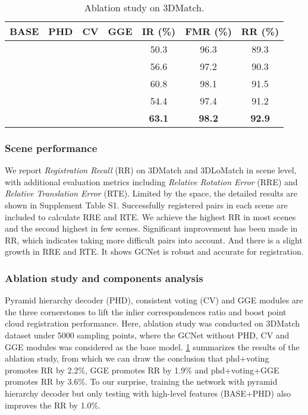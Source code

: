 \documentclass[10pt,twocolumn,letterpaper]{article}
\begin{document}
\begin{table}[t!]
\setlength{\tabcolsep}{4pt}
\centering\footnotesize
\vspace{.25em}
\begin{tabular}{cccc|ccc}
\toprule
BASE & PHD & CV & GGE & IR (\%)  & FMR (\%)  & RR (\%)  \\
\midrule
 & & & & 50.3 & 96.3 & 89.3 \\
 &  & & & 56.6 & 97.2 & 90.3 \\
 &  &  & & 60.8 & 98.1 & 91.5 \\
 & & &  & 54.4 & 97.4 & 91.2 \\
 &  &  &  & {\bf 63.1} & {\bf 98.2} & {\bf 92.9} \\
\bottomrule
\end{tabular}
\vspace{-.75em}
\caption{Ablation study on 3DMatch.}
\vspace{-2em}
\label{tab:ab_study}
\end{table}

\vspace{-1.25em}
\subsubsection{Scene performance} \vspace{-.5em}
We report {\em Registration Recall} (RR) on 3DMatch and 3DLoMatch in scene level, with additional evaluation metrics including  {\em Relative Rotation Error} (RRE) and {\em Relative Translation Error} (RTE). Limited by the space, the detailed results are shown in Supplement Table S1. Successfully registered pairs in each scene are included to calculate RRE and RTE. We achieve the highest RR in most scenes and the second highest in few scenes. Significant improvement has been made in RR, which indicates taking more difficult pairs into account. And there is a slight growth in RRE and RTE. It shows GCNet is robust and accurate for registration.

\vspace{-1.25em}
\subsubsection{Ablation study and components analysis}
\vspace{-.25em}

Pyramid hierarchy decoder (PHD), consistent voting (CV) and GGE modules are the three cornerstones to lift the inlier correspondences ratio and boost point cloud registration performance. Here, ablation study was conducted on 3DMatch dataset under 5000 sampling points, where the GCNet without PHD, CV and GGE modules was considered as the base model. \cref{tab:ab_study} summarizes the results of the ablation study, from which we can draw the conclusion that phd+voting promotes RR by 2.2\%, GGE promotes RR by 1.9\% and phd+voting+GGE promotes RR by 3.6\%. To our surprise, training the network with pyramid hierarchy decoder but only testing with high-level features (BASE+PHD) also improves the RR by 1.0\%.
\end{document}
